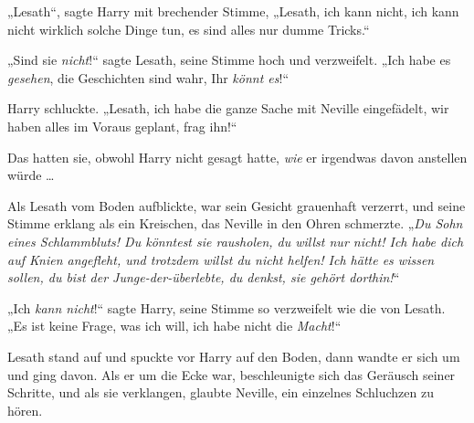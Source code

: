 „Lesath“, sagte Harry mit brechender Stimme,
„Lesath, ich kann nicht, ich kann nicht wirklich solche Dinge tun, es sind alles nur dumme Tricks.“

„Sind sie \emph{nicht}!“ sagte Lesath, seine Stimme hoch und verzweifelt.
„Ich habe es \emph{gesehen}, die Geschichten sind wahr, Ihr \emph{könnt es}!“

Harry schluckte.
„Lesath, ich habe die ganze Sache mit Neville eingefädelt, wir haben alles im Voraus geplant, frag ihn!“

Das hatten sie, obwohl Harry nicht gesagt hatte, \emph{wie} er irgendwas davon anstellen würde …

Als Lesath vom Boden aufblickte, war sein Gesicht grauenhaft verzerrt, und seine Stimme erklang als ein Kreischen, das Neville in den Ohren schmerzte.
„\emph{Du Sohn eines Schlammbluts! Du könntest sie rausholen, du willst nur nicht! Ich habe dich auf Knien angefleht, und trotzdem willst du nicht helfen! Ich hätte es wissen sollen, du bist der Junge-der-überlebte, du denkst, sie gehört dorthin!}“

„Ich \emph{kann nicht}!“ sagte Harry, seine Stimme so verzweifelt wie die von Lesath.
„Es ist keine Frage, was ich will, ich habe nicht die \emph{Macht}!“

Lesath stand auf und spuckte vor Harry auf den Boden, dann wandte er sich um und ging davon. Als er um die Ecke war, beschleunigte sich das Geräusch seiner Schritte, und als sie verklangen, glaubte Neville, ein einzelnes Schluchzen zu hören.

